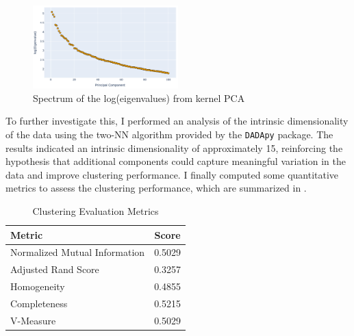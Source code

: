 \begin{figure}[ht]
    \centering
    \includegraphics[width=0.5\textwidth]{images/best_kPCA_spectrum.png}
    \caption{\footnotesize Spectrum of the log(eigenvalues) from kernel PCA}
    \label{fig:kpa_spectrum}
\end{figure}
\newpage
To further investigate this, I performed an analysis of the intrinsic dimensionality of the data using the two-NN algorithm 
provided by the \texttt{DADApy} package. The results indicated an intrinsic dimensionality of approximately 15, reinforcing the 
hypothesis that additional components could capture meaningful variation in the data and improve clustering performance. I finally computed 
some quantitative metrics to assess the clustering performance, which are summarized in .
\begin{table}[h!]
    \centering
    \begin{tabular}{|l|c|}
    \hline
    \textbf{Metric}                  & \textbf{Score}         \\ \hline
    Normalized Mutual Information    & 0.5029                 \\ 
    Adjusted Rand Score              & 0.3257                 \\
    Homogeneity                      & 0.4855                 \\
    Completeness                     & 0.5215                 \\
    V-Measure                        & 0.5029                 \\ \hline
    \end{tabular}
    \caption{Clustering Evaluation Metrics}
    \label{tab:clustering_metrics}
\end{table}

